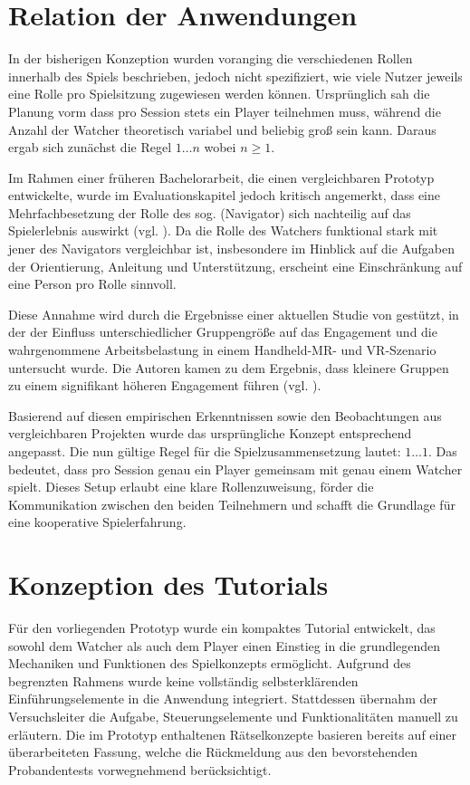 \section{Relation der Anwendungen}

In der bisherigen Konzeption wurden voranging die verschiedenen Rollen innerhalb des Spiels beschrieben, jedoch nicht spezifiziert, wie viele Nutzer jeweils eine Rolle pro Spielsitzung zugewiesen werden können. Ursprünglich sah die Planung vorm dass pro Session stets ein Player teilnehmen muss, während die Anzahl der Watcher theoretisch variabel und beliebig groß sein kann. Daraus ergab sich zunächst die Regel $1\ldots n$ \quad wobei $n \geq 1$.

Im Rahmen einer früheren Bachelorarbeit, die einen vergleichbaren Prototyp entwickelte, wurde im Evaluationskapitel jedoch kritisch angemerkt, dass eine Mehrfachbesetzung der Rolle des sog.  (Navigator) sich nachteilig auf das Spielerlebnis auswirkt (vgl. \citealp[S. 34]{lotz_konzeption_2021}). Da die Rolle des Watchers funktional stark mit jener des Navigators vergleichbar ist, insbesondere im Hinblick auf die Aufgaben der Orientierung, Anleitung und Unterstützung, erscheint eine Einschränkung auf eine Person pro Rolle sinnvoll.

Diese Annahme wird durch die Ergebnisse einer aktuellen Studie von \cite{bautista_isaza_understanding_2024} gestützt, in der der Einfluss unterschiedlicher Gruppengröße auf das Engagement und die wahrgenommene Arbeitsbelastung in einem Handheld-\ac{MR}- und \ac{VR}-Szenario untersucht wurde. Die Autoren kamen zu dem Ergebnis, dass kleinere Gruppen zu einem signifikant höheren Engagement führen (vgl. \citealp[S. 197:22]{bautista_isaza_understanding_2024}).

Basierend auf diesen empirischen Erkenntnissen sowie den Beobachtungen aus vergleichbaren Projekten wurde das ursprüngliche Konzept entsprechend angepasst. Die nun gültige Regel für die Spielzusammensetzung lautet: $1\ldots1$. Das bedeutet, dass pro Session genau ein Player gemeinsam mit genau einem Watcher spielt. Dieses Setup erlaubt eine klare Rollenzuweisung, förder die Kommunikation zwischen den beiden Teilnehmern und schafft die Grundlage für eine kooperative Spielerfahrung.

\section{Konzeption des Tutorials}

Für den vorliegenden Prototyp wurde ein kompaktes Tutorial entwickelt, das sowohl dem Watcher als auch dem Player einen Einstieg in die grundlegenden Mechaniken und Funktionen des Spielkonzepts ermöglicht. Aufgrund des begrenzten Rahmens wurde keine vollständig selbsterklärenden Einführungselemente in die Anwendung integriert. Stattdessen übernahm der Versuchsleiter die Aufgabe, Steuerungselemente und Funktionalitäten manuell zu erläutern. Die im Prototyp enthaltenen Rätselkonzepte basieren bereits auf einer überarbeiteten Fassung, welche die Rückmeldung aus den bevorstehenden Probandentests vorwegnehmend berücksichtigt.

